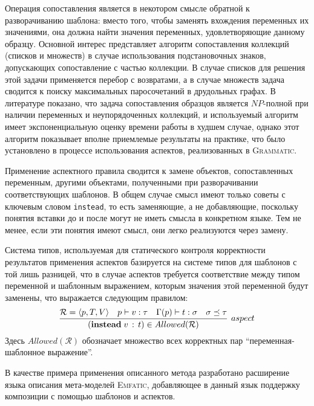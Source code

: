 \documentclass[12pt,a4paper]{article}
\newcommand{\code}[1]{\mbox{\texttt{#1}}}
\newcommand{\tool}[1]{\textsc{#1}}
\theoremstyle{definition}
\theoremstyle{plain}
\newcommand{\GRM}{\tool{Grammatic}}
\begin{document}
Операция сопоставления является в некотором смысле обратной к разворачиванию шаблона: вместо того, чтобы заменять вхождения переменных их значениями, она должна найти значения переменных, удовлетворяющие данному образцу. Основной интерес представляет алгоритм сопоставления коллекций (списков и множеств) в случае использования подстановочных знаков, допускающих сопоставление с частью коллекции. В случае списков для решения этой задачи применяется перебор с возвратами, а в случае множеств задача сводится к поиску максимальных паросочетаний в друдольных графах. В литературе показано, что задача сопоставления образцов является $NP$-полной при наличии переменных и неупорядоченных коллекций, и используемый алгоритм имеет экспоненциальную оценку времени работы в худшем случае, однако этот алгоритм показывает вполне приемлемые результаты на практике, что было установлено в процессе использования аспектов, реализованных в \GRM{}.

Применение аспектного правила сводится к замене объектов, сопоставленных переменным, другими объектами, полученными при разворачивании соответствующих шаблонов. В общем случае смысл имеют только советы с ключевым словом \code{instead}, то есть заменяющие, а не добавляющие, поскольку понятия вставки до и после могут не иметь смысла в конкретном языке. Тем не менее, если эти понятия имеют смысл, они легко реализуются через замену.

Система типов, используемая для статического контроля корректности результатов применения аспектов базируется на системе типов для шаблонов с той лишь разницей, что в случае аспектов требуется соответствие между типом переменной и шаблонным выражением, которым значения этой переменной будут заменены, что выражается следующим правилом:
$$
	\infer[aspect]{
		(\mathbf{instead} \; v \, : \, t) \in Allowed(\mathcal{R})
	}{
		\mathcal{R} = \langle p, T, V \rangle &
		p \vdash v : \tau &
		\Gamma(p) \vdash t : \sigma &
		\sigma \preceq \tau
	}
$$
Здесь $Allowed(\mathcal{R})$ обозначает множество всех корректных пар ``переменная-шаблонное выражение''.

В качестве примера применения описанного метода разработано расширение языка описания мета-моделей \tool{Emfatic}, добавляющее в данный язык поддержку композиции с помощью шаблонов и аспектов.
\end{document}
